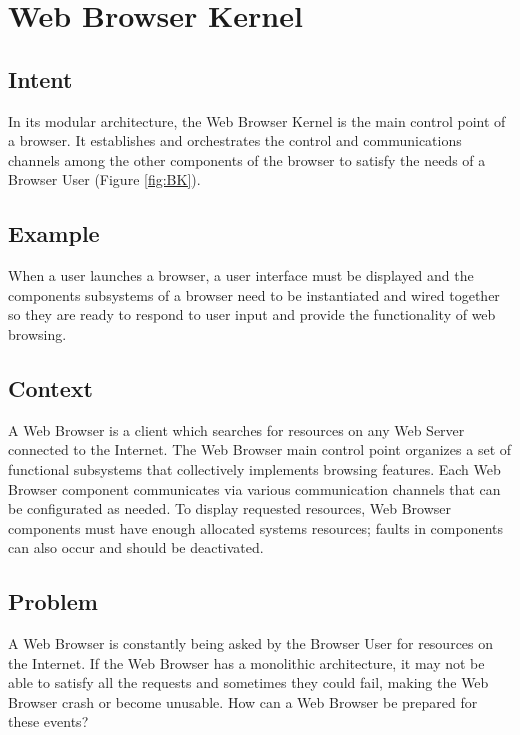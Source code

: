 \documentclass[prodmode,hillsideplop]{acmlarge}
\begin{document}
\section{Web Browser Kernel}
\subsection{Intent}
In its modular architecture, the Web Browser Kernel is the main control point of a browser. It establishes and orchestrates the control and communications channels among the other components of the browser to satisfy the needs of a Browser User (Figure \ref{fig:BK}).


\subsection{Example}

When a user launches a browser, a user interface must be displayed and the components subsystems  of a browser need to be instantiated and wired together so they are ready to respond to user input and provide the functionality of web browsing. 

\subsection{Context}
A Web Browser is a client which searches for resources on any Web Server connected to the Internet. The Web Browser main control point organizes a set of functional subsystems that collectively implements browsing features. Each Web Browser component communicates via various communication channels that can be configurated as needed. To display requested resources, Web Browser components must have enough allocated systems resources; faults in components can also occur and should be deactivated.

\subsection{Problem}
A Web Browser is constantly being asked by the Browser User for resources on the Internet. If the Web Browser has a monolithic architecture, it may not be able to satisfy all the requests and sometimes they could fail, making the Web Browser crash or become unusable. How can a Web Browser be prepared for these events?
\end{document}
